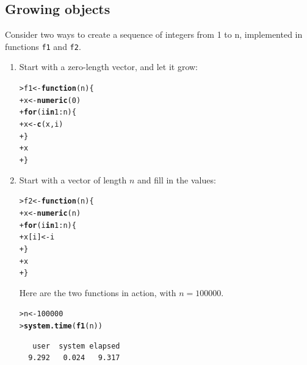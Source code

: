 \documentclass[12pt,oneside]{book}\usepackage[]{graphicx}\usepackage[]{color}
\makeatletter
\newcommand{\hlnum}[1]{\textcolor[rgb]{0.686,0.059,0.569}{#1}}%
\newcommand{\hlopt}[1]{\textcolor[rgb]{0,0,0}{#1}}%
\newcommand{\hlstd}[1]{\textcolor[rgb]{0.345,0.345,0.345}{#1}}%
\newcommand{\hlkwa}[1]{\textcolor[rgb]{0.161,0.373,0.58}{\textbf{#1}}}%
\newcommand{\hlkwb}[1]{\textcolor[rgb]{0.69,0.353,0.396}{#1}}%
\newcommand{\hlkwc}[1]{\textcolor[rgb]{0.333,0.667,0.333}{#1}}%
\newcommand{\hlkwd}[1]{\textcolor[rgb]{0.737,0.353,0.396}{\textbf{#1}}}%
\newenvironment{kframe}{%
 \def\at@end@of@kframe{}%
 \ifinner\ifhmode%
  \def\at@end@of@kframe{\end{minipage}}%
  \begin{minipage}{\columnwidth}%
 \fi\fi%
 \def\FrameCommand##1{\hskip\@totalleftmargin \hskip-\fboxsep
 \colorbox{shadecolor}{##1}\hskip-\fboxsep
     \hskip-\linewidth \hskip-\@totalleftmargin \hskip\columnwidth}%
 \MakeFramed {\advance\hsize-\width
   \@totalleftmargin\z@ \linewidth\hsize
   \@setminipage}}%
 {\par\unskip\endMakeFramed%
 \at@end@of@kframe}
\newenvironment{knitrout}{}{} %
\makeatother
\begin{document}
\subsection{Growing objects}
Consider two ways to create a sequence of integers from 1 to n, implemented in functions \verb+f1+ and \verb+f2+. 
\begin{enumerate}
\item Start with a zero-length vector, and let it grow:
\begin{knitrout}
\color{fgcolor}\begin{kframe}
\begin{alltt}
\hlstd{> }\hlstd{f1} \hlkwb{<-} \hlkwa{function}\hlstd{(}\hlkwc{n}\hlstd{) \{}
\hlstd{+ }    \hlstd{x} \hlkwb{<-} \hlkwd{numeric}\hlstd{(}\hlnum{0}\hlstd{)}
\hlstd{+ }    \hlkwa{for} \hlstd{(i} \hlkwa{in} \hlnum{1}\hlopt{:}\hlstd{n) \{}
\hlstd{+ }        \hlstd{x} \hlkwb{<-} \hlkwd{c}\hlstd{(x, i)}
\hlstd{+ }    \hlstd{\}}
\hlstd{+ }    \hlstd{x}
\hlstd{+ }\hlstd{\}}
\end{alltt}
\end{kframe}
\end{knitrout}
\item Start with a vector of length $n$ and fill in the values:
\begin{knitrout}
\color{fgcolor}\begin{kframe}
\begin{alltt}
\hlstd{> }\hlstd{f2} \hlkwb{<-} \hlkwa{function}\hlstd{(}\hlkwc{n}\hlstd{) \{}
\hlstd{+ }    \hlstd{x} \hlkwb{<-} \hlkwd{numeric}\hlstd{(n)}
\hlstd{+ }    \hlkwa{for} \hlstd{(i} \hlkwa{in} \hlnum{1}\hlopt{:}\hlstd{n) \{}
\hlstd{+ }        \hlstd{x[i]} \hlkwb{<-} \hlstd{i}
\hlstd{+ }    \hlstd{\}}
\hlstd{+ }    \hlstd{x}
\hlstd{+ }\hlstd{\}}
\end{alltt}
\end{kframe}
\end{knitrout}
Here are the two functions in action, with $n = 100000$.
\begin{knitrout}
\color{fgcolor}\begin{kframe}
\begin{alltt}
\hlstd{> }\hlstd{n} \hlkwb{<-} \hlnum{100000}
\hlstd{> }\hlkwd{system.time}\hlstd{(}\hlkwd{f1}\hlstd{(n))}
\end{alltt}
\begin{verbatim}
   user  system elapsed 
  9.292   0.024   9.317 

\end{verbatim}
\end{kframe}
\end{knitrout}
\end{enumerate}
\end{document}
